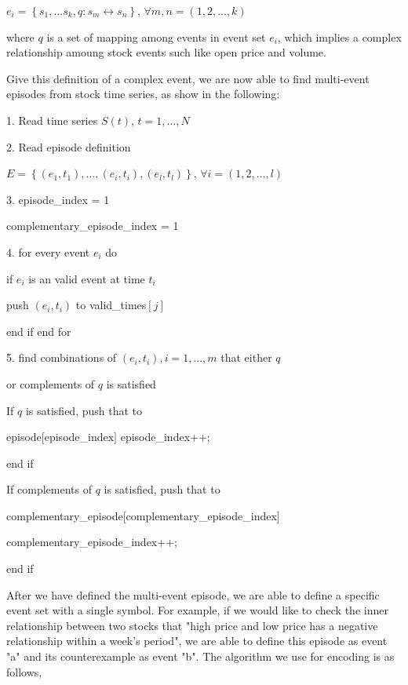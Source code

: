 \documentclass[10pt, conference, compsocconf]{IEEEtran}
\begin{document}
$e_{i}=\left \{ s_{1},...s_{k},q:s_{m}\leftrightarrow s_{n} \right \}$, $\forall m,n=(1,2,...,k)$
\par
where $q$ is a set of mapping among events in event set $e_{i}$, which implies a complex relationship amoung stock events such like open price and volume.
\par
Give this definition of a complex event, we are now able to find multi-event episodes from stock time series, as show in the following:
\vspace{1.2mm}
\par
1. Read time series $S\left ( t \right )$, $t=1,...,N$
\par
2. Read episode definition 
\par\quad $E=\left \{ (e_{1},t_{1}),...,(e_{i},t_{i}),(e_{l},t_{l}) \right \}$, $\forall i=(1,2,...,l)$
\par
3. episode\_index = 1
\par\quad complementary\_episode\_index = 1
\par
4. for every event $e_{i}$ do
\par\quad if $e_{i}$ is an valid event at time $t_{i}$
\par\quad push $(e_{i},t_{i})$ to valid\_times$\left [ j \right ]$
\par\quad end if  end for
\par

5. find combinations of $(e_{i},t_{i}), i=1,...,m$ that either $q$ 
\par\quad or complements of $q$ is satisfied
\par\quad If $q$ is satisfied, push that to 
\par\quad episode$[$episode\_index$]$ episode\_index++;
\par\quad end if
\par\quad If complements of $q$ is satisfied, push that to 
\par\quad complementary\_episode$[$complementary\_episode\_index$]$
\par\quad complementary\_episode\_index++;
\par\quad end if
\vspace{1.2mm}
\par

After we have defined the multi-event episode, we are able to define a specific event set with a single symbol. For example, if we would like to check the inner relationship between two stocks that "high price and low price has a negative relationship
within a week's period", we are able to define this episode as event "a" and its counterexample as event "b". The algorithm we use for encoding is as follows,
\par
\end{document}
